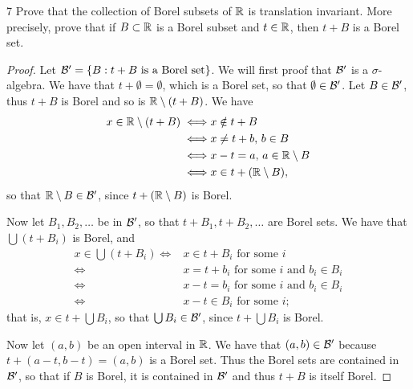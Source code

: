 \begin{exercise}{7}
Prove that the collection of Borel subsets of $\mathbb{R}$ is translation invariant.
More precisely, prove that if $B \subset \mathbb{R}$ is a Borel subset and $t \in \mathbb{R}$, then $t+B$ is a Borel set.
\end{exercise}
\begin{proof}
Let $\mathcal{B}' = \{B: t+B \text{ is a Borel set}\}$.
We will first proof that $\mathcal{B}'$ is a $\sigma$-algebra.
We have that $t+\emptyset = \emptyset$, which is a Borel set, so that $\emptyset \in \mathcal{B}'$.
Let $B\in\mathcal{B}'$, thus $t+B$ is Borel and so is $\mathbb{R} \setminus (t+B)$.
We have
\begin{align*}
    x \in \mathbb{R} \setminus (t+B) 
    \iff& x \notin t+B\\
    \iff& x \neq t+b,\, b \in B\\
    \iff& x-t = a,\, a \in \mathbb{R}\setminus B\\
    \iff& x \in t+(\mathbb{R} \setminus B),
\end{align*}
so that $\mathbb{R} \setminus B \in \mathcal{B}'$, since $t + (\mathbb{R} \setminus B)$ is Borel.

Now let $B_1, B_2, \dots$ be in $\mathcal{B}'$, so that $t+B_1, t+B_2, \dots$ are Borel sets.
We have that $\bigcup (t+B_i)$ is Borel, and 
\begin{align*}
    x \in \bigcup (t+B_i)
    \iff& x \in t + B_i \text{ for some } i\\
    \iff& x = t + b_i \text{ for some } i \text{ and }b_i \in B_i\\
    \iff& x-t = b_i  \text{ for some } i \text{ and }b_i \in B_i\\
    \iff& x-t \in B_i  \text{ for some } i;
\end{align*}
that is, $x \in t+\bigcup B_i$, so that $\bigcup B_i \in \mathcal{B}'$, since $t + \bigcup B_i$ is Borel.

Now let $(a,b)$ be an open interval in $\mathbb{R}$.
We have that $(a,b) \in \mathcal{B}'$ because $t + (a-t, b-t) = (a,b)$ is a Borel set.
Thus the Borel sets are contained in $\mathcal{B}'$, so that if $B$ is Borel, it is contained in $\mathcal{B}'$ and thus $t+B$ is itself Borel.
\end{proof} 

